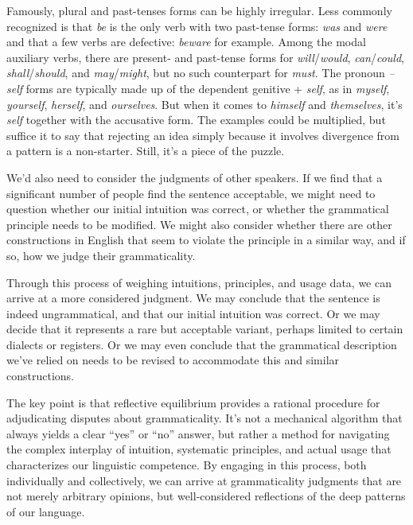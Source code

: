 Famously, plural and past-tenses forms can be highly irregular. Less commonly recognized is that \textit{be} is the only verb with two past-tense forms: \textit{was} and \textit{were} and that a few verbs are defective: \textit{beware} for example. Among the modal auxiliary verbs, there are present- and past-tense forms for \textit{will}/\textit{would}, \textit{can}/\textit{could}, \textit{shall}/\textit{should}, and \textit{may}/\textit{might}, but no such counterpart for \textit{must}. The pronoun \textit{--self} forms are typically made up of the dependent genitive + \textit{self}, as in \textit{myself}, \textit{yourself}, \textit{herself}, and \textit{ourselves}. But when it comes to \textit{himself} and \textit{themselves}, it's \textit{self} together with the accusative form. The examples could be multiplied, but suffice it to say that rejecting an idea simply because it involves divergence from a pattern is a non-starter. Still, it's a piece of the puzzle.

We'd also need to consider the judgments of other speakers. If we find that a significant number of people find the sentence acceptable, we might need to question whether our initial intuition was correct, or whether the grammatical principle needs to be modified. We might also consider whether there are other constructions in English that seem to violate the principle in a similar way, and if so, how we judge their grammaticality.

Through this process of weighing intuitions, principles, and usage data, we can arrive at a more considered judgment. We may conclude that the sentence is indeed ungrammatical, and that our initial intuition was correct. Or we may decide that it represents a rare but acceptable variant, perhaps limited to certain dialects or registers. Or we may even conclude that the grammatical description we've relied on needs to be revised to accommodate this and similar constructions.

The key point is that reflective equilibrium provides a rational procedure for adjudicating disputes about grammaticality. It's not a mechanical algorithm that always yields a clear \enquote{yes} or \enquote{no} answer, but rather a method for navigating the complex interplay of intuition, systematic principles, and actual usage that characterizes our linguistic competence. By engaging in this process, both individually and collectively, we can arrive at grammaticality judgments that are not merely arbitrary opinions, but well-considered reflections of the deep patterns of our language.

